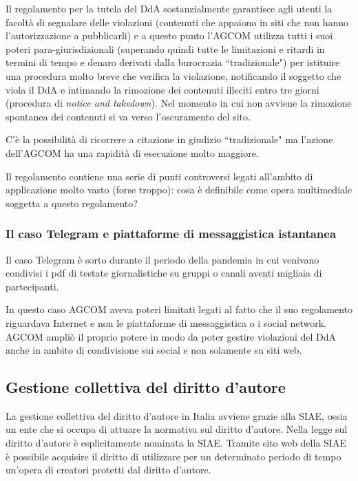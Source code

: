 Il regolamento per la tutela del DdA sostanzialmente garantisce agli utenti la facoltà di segnalare delle violazioni (contenuti che appaiono in siti che non hanno l'autorizzazione a pubblicarli) e a questo punto l'AGCOM utilizza tutti i suoi poteri para-giurisdizionali (superando quindi tutte le limitazioni e ritardi in termini di tempo e denaro derivati dalla burocrazia ``tradizionale") per istituire una procedura molto breve che verifica la violazione, notificando il soggetto che viola il DdA e intimando la rimozione dei contenuti illeciti entro tre giorni (procedura di \textit{notice and takedown}). 
Nel momento in cui non avviene la rimozione spontanea dei contenuti si va verso l'oscuramento del sito. 

C'è la possibilità di ricorrere a citazione in giudizio ``tradizionale" ma l'azione dell'AGCOM ha una rapidità di esecuzione molto maggiore.

Il regolamento contiene una serie di punti controversi legati all'ambito di applicazione molto vasto (forse troppo): cosa è definibile come opera multimediale soggetta a questo regolamento?

\subsubsection{Il caso Telegram e piattaforme di messaggistica istantanea}

Il caso Telegram è sorto durante il periodo della pandemia in cui venivano condivisi i pdf di testate giornalistiche su gruppi o canali aventi migliaia di partecipanti. 

In questo caso AGCOM aveva poteri limitati legati al fatto che il suo regolamento riguardava Internet e non le piattaforme di messaggistica o i social network. 
AGCOM ampliò il proprio potere in modo da poter gestire violazioni del DdA anche in ambito di condivisione sui social e non solamente su siti web.

\subsection{Gestione collettiva del diritto d'autore}
La gestione collettiva del diritto d'autore in Italia avviene grazie alla SIAE, ossia un ente che si occupa di attuare la normativa sul diritto d'autore. Nella legge sul diritto d'autore è esplicitamente nominata la SIAE. 
Tramite sito web della SIAE è possibile acquisire il diritto di utilizzare per un determinato periodo di tempo un'opera di creatori protetti dal diritto d'autore. 

